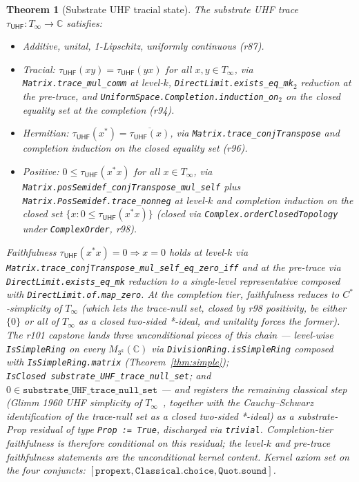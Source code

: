 \documentclass[11pt,a4paper]{amsart}
\theoremstyle{plain}
\newtheorem{theorem}{Theorem}[section]
\theoremstyle{definition}
\begin{document}
\begin{theorem}[Substrate UHF tracial state]\label{thm:uhf-trace}
The substrate UHF trace $\tau_{\textsf{UHF}} \colon T_\infty \to \mathbb{C}$ satisfies:
\begin{itemize}[itemsep=1pt]
\item \emph{Additive, unital, 1-Lipschitz, uniformly continuous} (r87).
\item \emph{Tracial}: $\tau_{\textsf{UHF}}(xy) = \tau_{\textsf{UHF}}(yx)$ for all $x, y \in T_\infty$, via \texttt{Matrix.trace\_mul\_comm} at level-$k$, \texttt{DirectLimit.exists\_eq\_mk}$_2$ reduction at the pre-trace, and \texttt{UniformSpace.Completion.induction\_on}$_2$ on the closed equality set at the completion (r94).
\item \emph{Hermitian}: $\tau_{\textsf{UHF}}(x^*) = \overline{\tau_{\textsf{UHF}}(x)}$, via \texttt{Matrix.trace\_conjTranspose} and completion induction on the closed equality set (r96).
\item \emph{Positive}: $0 \le \tau_{\textsf{UHF}}(x^* x)$ for all $x \in T_\infty$, via \texttt{Matrix.posSemidef\_conjTranspose\_mul\_self} plus \texttt{Matrix.PosSemidef.trace\_nonneg} at level-$k$ and completion induction on the closed set $\{x : 0 \le \tau_{\textsf{UHF}}(x^* x)\}$ (closed via \texttt{Complex.orderClosedTopology} under \texttt{ComplexOrder}, r98).
\end{itemize}
Faithfulness $\tau_{\textsf{UHF}}(x^* x) = 0 \Rightarrow x = 0$ holds at level-$k$ via \texttt{Matrix.trace\_conjTranspose\_mul\_self\_eq\_zero\_iff} and at the pre-trace via \texttt{DirectLimit.exists\_eq\_mk} reduction to a single-level representative composed with \texttt{DirectLimit.of.map\_zero}. At the completion tier, faithfulness reduces to $C^*$-simplicity of $T_\infty$ (which lets the trace-null set, closed by r98 positivity, be either $\{0\}$ or all of $T_\infty$ as a closed two-sided *-ideal, and unitality forces the former). The r101 capstone lands three unconditional pieces of this chain --- level-wise \texttt{IsSimpleRing} on every $M_{3^k}(\mathbb{C})$ via \texttt{DivisionRing.isSimpleRing} composed with \texttt{IsSimpleRing.matrix} (Theorem~\ref{thm:simple}); \texttt{IsClosed}~\texttt{substrate\_UHF\_trace\_null\_set}; and $0 \in \texttt{substrate\_UHF\_trace\_null\_set}$ --- and registers the remaining classical step (Glimm 1960 UHF simplicity of $T_\infty$~\cite{glimm1960}, together with the Cauchy--Schwarz identification of the trace-null set as a closed two-sided *-ideal) as a substrate-Prop residual  of type \texttt{Prop := True}, discharged via \texttt{trivial}. Completion-tier faithfulness is therefore conditional on this residual; the level-$k$ and pre-trace faithfulness statements are the unconditional kernel content. Kernel axiom set on the four conjuncts: $[\texttt{propext}, \texttt{Classical.choice}, \texttt{Quot.sound}]$.
\end{theorem}
\end{document}
